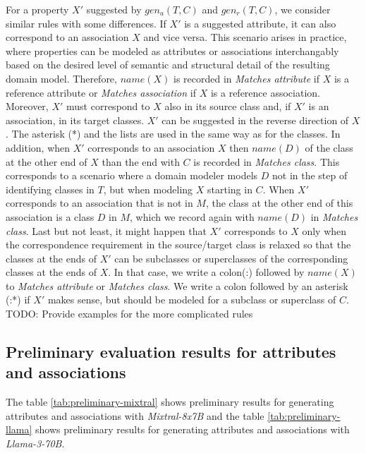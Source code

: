 For a property $X'$ suggested by $gen_a(T,C)$ and $gen_r(T,C)$, we consider similar rules with some differences.
If $X'$ is a suggested attribute, it can also correspond to an association $X$ and vice versa.
This scenario arises in practice, where properties can be modeled as attributes or associations interchangably based on the desired level of semantic and structural detail of the resulting domain model.
Therefore, $name(X)$ is recorded in \emph{Matches attribute} if $X$ is a reference attribute or \emph{Matches association} if $X$ is a reference association.
Moreover, $X'$ must correspond to $X$ also in its source class and, if $X'$ is an association, in its target classes.
$X'$ can be suggested in the reverse direction of $X$.
The asterisk (*) and the lists are used in the same way as for the classes.
In addition, when $X'$ corresponds to an association $X$ then $name(D)$ of the class at the other end of $X$ than the end with $C$ is recorded in \emph{Matches class}.
This corresponds to a scenario where a domain modeler models $D$ not in the step of identifying classes in $T$, but when modeling $X$ starting in $C$.
When $X'$ corresponds to an association that is not in $M$, the class at the other end of this association is a class $D$ in $M$, which we record again with $name(D)$ in \emph{Matches class}.
Last but not least, it might happen that $X'$ corresponds to $X$ only when the correspondence requirement in the source/target class is relaxed so that the classes at the ends of $X'$ can be subclasses or superclasses of the corresponding classes at the ends of $X$.
In that case, we write a colon(:) followed by $name(X)$ to \emph{Matches attribute} or \emph{Matches class}.
We write a colon followed by an asterisk (:*) if $X'$ makes sense, but should be modeled for a subclass or superclass of $C$. \\

\noindent{}TODO: Provide examples for the more complicated rules


\subsection{Preliminary evaluation results for attributes and associations}
\label{sec:preliminary_attributes_associations}

The table \ref{tab:preliminary-mixtral} shows preliminary results for generating attributes and associations with \emph{Mixtral-8x7B} and the table \ref{tab:preliminary-llama} shows preliminary results for generating attributes and associations with \emph{Llama-3-70B}.

